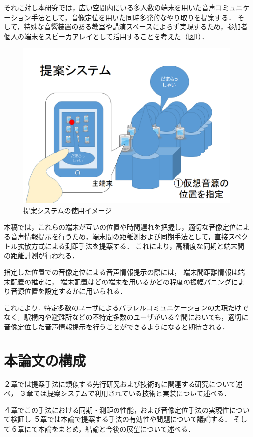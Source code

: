 それに対し本研究では，広い空間内にいる多人数の端末を用いた音声コミュニケーション手法として，音像定位を用いた同時多発的なやり取りを提案する．
そして，特殊な音響装置のある教室や講演スペースによらず実現するため，参加者個人の端末をスピーカアレイとして活用することを考えた（図\ref{fig:shikumi1}）．


\begin{figure}[p]
  \centering
  \includegraphics[clip,width=1.05\hsize]{img/shikumi1.png}
  \caption{提案システムの使用イメージ}\label{fig:shikumi1}
\end{figure}


本稿では，これらの端末が互いの位置や時間遅れを把握し，適切な音像定位による音声情報提示を行うため，端末間の距離測および同期手法として，直接スペクトル拡散方式による測距手法を提案する．
これにより，高精度な同期と端末間の距離計測が行われる．

指定した位置での音像定位による音声情報提示の際には，
端末間距離情報は端末配置の推定に，
端末配置はどの端末を用いるかどの程度の振幅パニングにより音源位置を設定するかに用いられる．

これにより，特定多数のユーザによるパラレルコミュニケーションの実現だけでなく，駅構内や避難所などの不特定多数のユーザがいる空間においても，適切に音像定位した音声情報提示を行うことができるようになると期待される．



\clearpage

\section{本論文の構成}

２章では提案手法に類似する先行研究および技術的に関連する研究について述べ，
３章では提案システムで利用されている技術と実装について述べる．

４章でこの手法における同期・測距の性能，および音像定位手法の実現性について検証し
５章では本論で提案する手法の有効性や問題について議論する．
そして６章にて本論をまとめ，結論と今後の展望について述べる．
